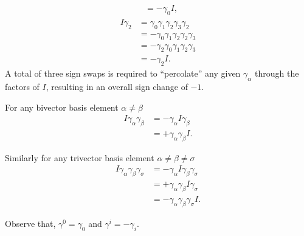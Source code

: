 {\begin{equation}
\begin{aligned}
&=
-
\gamma_0 I,
\end{aligned}
\end{equation}
\begin{equation}\label{eqn:lorentzForceCovariant:740}
\begin{aligned}
   I \gamma_2
&=
\gamma_0
\gamma_1
\gamma_2
\gamma_3
\gamma_2 \\
&=
-
\gamma_0
\gamma_1
\gamma_2
\gamma_2
\gamma_3 \\
&=
-
\gamma_2
\gamma_0
\gamma_1
\gamma_2
\gamma_3 \\
&= -\gamma_2 I.
\end{aligned}
\end{equation}
A total of three sign swaps is required to ``percolate'' any given \(\gamma_\alpha\) through the factors of \( I \), resulting in an overall sign change of \( -1 \).

For any bivector basis element \( \alpha \ne \beta \)
\begin{equation}\label{eqn:lorentzForceCovariant:760}
\begin{aligned}
   I \gamma_\alpha \gamma_\beta
   &= -\gamma_\alpha I \gamma_\beta \\
   &= +\gamma_\alpha \gamma_\beta I.
\end{aligned}
\end{equation}

Similarly
for any trivector basis element \( \alpha \ne \beta \ne \sigma \)
\begin{equation}\label{eqn:lorentzForceCovariant:780}
\begin{aligned}
   I \gamma_\alpha \gamma_\beta \gamma_\sigma
   &= -\gamma_\alpha I \gamma_\beta \gamma_\sigma \\
   &= +\gamma_\alpha \gamma_\beta I \gamma_\sigma \\
   &= -\gamma_\alpha \gamma_\beta \gamma_\sigma I.
\end{aligned}
\end{equation}
} %
Observe that, \( \gamma^0 = \gamma_0 \) and \( \gamma^i = -\gamma_i \).

